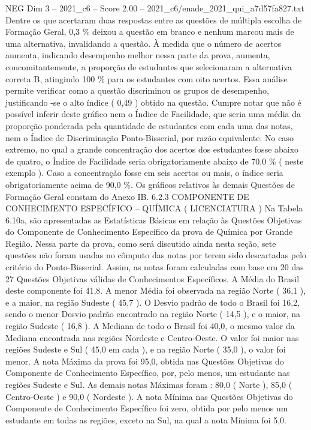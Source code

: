 \begin{textsample}{NEG Dim 3 – 2021\_c6 – Score 2.00 – 2021\_c6/enade\_2021\_qui\_a7d57fa827.txt}
Dentre os que acertaram duas respostas entre as questões de múltipla escolha de Formação Geral, 0,3 \% deixou a questão em branco e nenhum marcou mais de uma alternativa, invalidando a questão.
À medida que o número de acertos aumenta, indicando desempenho melhor nessa parte da prova, aumenta, concomitantemente, a proporção de estudantes que selecionaram a alternativa correta B, atingindo 100 \% para os estudantes com oito acertos.
Essa análise permite verificar como a questão discriminou os grupos de desempenho, justificando -se o alto índice ( 0,49 ) obtido na questão.
Cumpre notar que não é possível inferir deste gráfico nem o Índice de Facilidade, que seria uma média da proporção ponderada pela quantidade de estudantes com cada uma das notas, nem o Índice de Discriminação Ponto-Bisserial, por razão equivalente.
No caso extremo, no qual a grande concentração dos acertos dos estudantes fosse abaixo de quatro, o Índice de Facilidade seria obrigatoriamente abaixo de 70,0 \% ( neste exemplo ).
Caso a concentração fosse em seis acertos ou mais, o índice seria obrigatoriamente acima de 90,0 \%.
Os gráficos relativos às demais Questões de Formação Geral constam do Anexo IB. 6.2.3 COMPONENTE DE CONHECIMENTO ESPECÍFICO – QUÍMICA ( LICENCIATURA ) Na Tabela 6.10a, são apresentadas as Estatísticas Básicas em relação às Questões Objetivas do Componente de Conhecimento Específico da prova de Química por Grande Região.
Nessa parte da prova, como será discutido ainda nesta seção, sete questões não foram usadas no cômputo das notas por terem sido descartadas pelo critério do Ponto-Bisserial.
Assim, as notas foram calculadas com base em 20 das 27 Questões Objetivas válidas de Conhecimentos Específicos.
A Média do Brasil deste componente foi 41,8.
A menor Média foi observada na região Norte ( 36,1 ), e a maior, na região Sudeste ( 45,7 ).
O Desvio padrão de todo o Brasil foi 16,2, sendo o menor Desvio padrão encontrado na região Norte ( 14,5 ), e o maior, na região Sudeste ( 16,8 ).
A Mediana de todo o Brasil foi 40,0, o mesmo valor da Mediana encontrada nas regiões Nordeste e Centro-Oeste.
O valor foi maior nas regiões Sudeste e Sul ( 45,0 em cada ), e na região Norte ( 35,0 ), o valor foi menor.
A nota Máxima da prova foi 95,0, obtida nas Questões Objetivas do Componente de Conhecimento Específico, por, pelo menos, um estudante nas regiões Sudeste e Sul.
As demais notas Máximas foram : 80,0 ( Norte ), 85,0 ( Centro-Oeste ) e 90,0 ( Nordeste ).
A nota Mínima nas Questões Objetivas do Componente de Conhecimento Específico foi zero, obtida por pelo menos um estudante em todas as regiões, exceto na Sul, na qual a nota Mínima foi 5,0.

\end{textsample}
